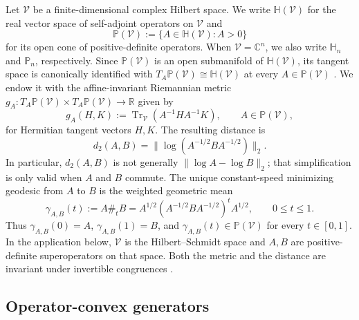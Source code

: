 \documentclass[11pt]{article}
\theoremstyle{remark}
\newcommand{\1}{\mathbbm{1}}
\begin{document}
Let $\mathcal V$ be a finite-dimensional complex Hilbert space.  We
write $\mathbb H(\mathcal V)$ for the real vector space of
self-adjoint operators on $\mathcal V$ and
\begin{equation*}
 \mathbb P(\mathcal V)
 :=\{A\in\mathbb H(\mathcal V):A>0\}
\end{equation*}
for its open cone of positive-definite operators.  When
$\mathcal V=\mathbb C^n$, we also write $\mathbb H_n$ and
$\mathbb P_n$, respectively.  Since $\mathbb P(\mathcal V)$ is an
open submanifold of $\mathbb H(\mathcal V)$, its tangent space is
canonically identified with
$T_A\mathbb P(\mathcal V)\cong\mathbb H(\mathcal V)$ at every
$A\in\mathbb P(\mathcal V)$ \cite[Chap.~6]{bhatia2009positive}.  We
endow it with the affine-invariant Riemannian metric
$g_A:T_A\mathbb P(\mathcal V)\times T_A\mathbb P(\mathcal V)
\to\mathbb R$ given by
\begin{equation}
 g_A(H,K):=\operatorname{Tr}_{\mathcal V}(A^{-1}HA^{-1}K),
 \qquad A\in\mathbb P(\mathcal V),
 \label{rw:eq:affine-invariant-metric}
\end{equation}
for Hermitian tangent vectors $H,K$.  The resulting distance is
\begin{equation}
 d_2(A,B)
 =\big\|\log(A^{-1/2}BA^{-1/2})\big\|_2.
 \label{rw:eq:affine-invariant-distance}
\end{equation}
In particular, $d_2(A,B)$ is not generally
$\|\log A-\log B\|_2$; that simplification is only valid when $A$ and
$B$ commute.  The unique constant-speed minimizing geodesic from
$A$ to $B$ is the weighted geometric mean
\begin{equation}
 \gamma_{A,B}(t):=A\#_tB
 =A^{1/2}(A^{-1/2}BA^{-1/2})^tA^{1/2},
 \qquad 0\leq t\leq1.
 \label{rw:eq:weighted-geometric-mean}
\end{equation}
Thus $\gamma_{A,B}(0)=A$, $\gamma_{A,B}(1)=B$, and
$\gamma_{A,B}(t)\in\mathbb P(\mathcal V)$ for every $t\in[0,1]$.
In the application below, $\mathcal V$ is the Hilbert--Schmidt space
and $A,B$ are positive-definite superoperators on that space.  Both
the metric and the distance are invariant under invertible
congruences \cite{bhatia2009positive,nielsen2013matrix}.


\subsection{Operator-convex generators}
\label{rw:subsec:operator-convex}
\end{document}
